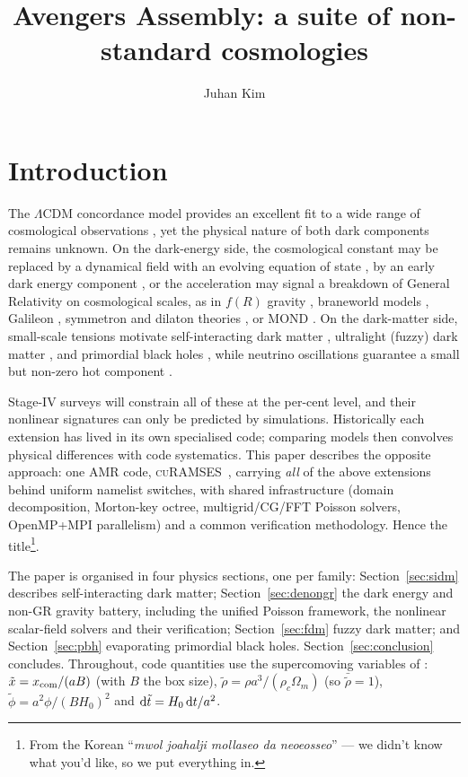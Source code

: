 \documentclass[11pt,a4paper]{article}
\title{\boldmath Avengers Assembly: a suite of non-standard cosmologies}
\author[a,1]{Juhan Kim\note{Corresponding author.}}
\affiliation[a]{Center for Advanced Computation, Korea Institute for Advanced Study,\\
85 Hoegiro, Dongdaemun-gu, Seoul 02455, Republic of Korea}
\newcommand{\curamses}{\textsc{cuRAMSES}}
\begin{document}
\maketitle


\section{Introduction}
\label{sec:intro}

The $\Lambda$CDM concordance model provides an excellent fit to a
wide range of cosmological observations \citep{Planck2020}, yet the
physical nature of both dark components remains unknown. On the
dark-energy side, the cosmological constant may be replaced by a
dynamical field with an evolving equation of state
\citep{ChevallierPolarski2001,Linder2003}, by an early dark energy
component \citep{Poulin2019}, or the acceleration may signal a
breakdown of General Relativity on cosmological scales, as in
$f(R)$ gravity \citep{HuSawicki2007}, braneworld models
\citep{Schmidt2009}, Galileon \citep{Barreira2013}, symmetron and
dilaton theories \citep{HinterbichlerKhoury2010,Brax2010}, or MOND
\citep{Milgrom1983}. On the dark-matter side, small-scale tensions
motivate self-interacting dark matter
\citep{SpergelSteinhardt2000,TulinYu2018}, ultralight (fuzzy) dark
matter \citep{Hui2017,Schive2014}, and primordial black holes
\citep{Carr2021}, while neutrino oscillations guarantee a small
but non-zero hot component \citep{LesgourguesPastor2006}.

Stage-IV surveys will constrain all of these at the per-cent
level, and their nonlinear signatures can only be predicted by
simulations. Historically each extension has lived in its own
specialised code; comparing models then convolves physical
differences with code systematics. This paper describes the
opposite approach: one AMR code, \curamses\ \citep{Kim2026},
carrying \emph{all} of the above extensions behind uniform
namelist switches, with shared infrastructure (domain
decomposition, Morton-key octree, multigrid/CG/FFT Poisson
solvers, OpenMP+MPI parallelism) and a common verification
methodology. Hence the title\footnote{From the Korean
``\emph{mwol joahalji mollaseo da neoeosseo}'' --- we didn't
know what you'd like, so we put everything in.}.

The paper is organised in four physics sections, one per family:
Section~\ref{sec:sidm} describes self-interacting dark matter;
Section~\ref{sec:denongr} the dark energy and non-GR gravity
battery, including the unified Poisson framework, the nonlinear
scalar-field solvers and their verification; Section~\ref{sec:fdm}
fuzzy dark matter; and Section~\ref{sec:pbh} evaporating
primordial black holes. Section~\ref{sec:conclusion} concludes.
Throughout, code quantities use the supercomoving variables of
\citet{MartelShapiro1998}: $\tilde x = x_{\rm com}/(aB)$
(with $B$ the box size), $\tilde\rho = \rho a^3/(\rho_c\Omega_m)$
(so $\bar{\tilde\rho}=1$), $\tilde\phi = a^2\phi/(BH_0)^2$ and
${\rm d}\tilde t = H_0\,{\rm d}t/a^2$.
\end{document}

